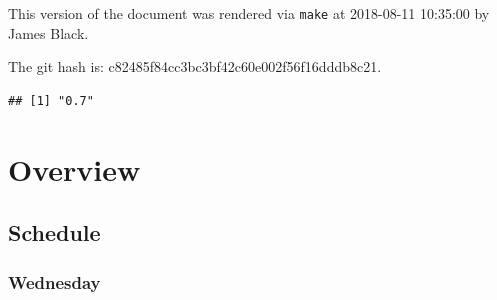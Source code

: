 \documentclass[]{book}
\makeatletter
\newenvironment{Shaded}{\begin{snugshade}}{\end{snugshade}}
\newcommand{\KeywordTok}[1]{\textcolor[rgb]{0.13,0.29,0.53}{\textbf{#1}}}
\newcommand{\NormalTok}[1]{#1}
\newcommand{\OperatorTok}[1]{\textcolor[rgb]{0.81,0.36,0.00}{\textbf{#1}}}
\newcommand{\StringTok}[1]{\textcolor[rgb]{0.31,0.60,0.02}{#1}}
\newenvironment{kframe}{%
\medskip{}
\setlength{\fboxsep}{.8em}
 \def\at@end@of@kframe{}%
 \ifinner\ifhmode%
  \def\at@end@of@kframe{\end{minipage}}%
  \begin{minipage}{\columnwidth}%
 \fi\fi%
 \def\FrameCommand##1{\hskip\@totalleftmargin \hskip-\fboxsep
 \colorbox{shadecolor}{##1}\hskip-\fboxsep
     \hskip-\linewidth \hskip-\@totalleftmargin \hskip\columnwidth}%
 \MakeFramed {\advance\hsize-\width
   \@totalleftmargin\z@ \linewidth\hsize
   \@setminipage}}%
 {\par\unskip\endMakeFramed%
 \at@end@of@kframe}
\renewenvironment{Shaded}{\begin{kframe}}{\end{kframe}}
\theoremstyle{definition}
\theoremstyle{definition}
\theoremstyle{definition}
\theoremstyle{remark}
\makeatother
\begin{document}
This version of the document was rendered via \texttt{make} at
2018-08-11 10:35:00 by James Black.

The git hash is: c82485f84cc3bc3bf42c60e002f56f16dddb8c21.

\begin{Shaded}
\end{Shaded}

\begin{verbatim}
## [1] "0.7"
\end{verbatim}

\hypertarget{part-overview}{%
\part{Overview}\label{part-overview}}

\hypertarget{schedule}{%
\chapter{Schedule}\label{schedule}}

\hypertarget{wednesday}{%
\section{Wednesday}\label{wednesday}}
\end{document}

